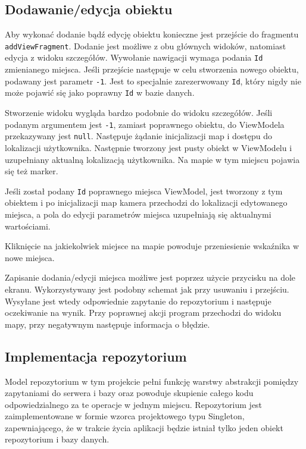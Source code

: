 \documentclass[polish,polish,a4paper,12pt]{article}
\begin{document}
	\subsection{Dodawanie/edycja obiektu}

	Aby wykonać dodanie bądź edycję obiektu konieczne jest przejście do fragmentu \texttt{addViewFragment}. Dodanie jest możliwe z obu głównych widoków, natomiast edycja z widoku szczegółów. Wywołanie nawigacji wymaga podania \texttt{Id} zmienianego miejsca. Jeśli przejście następuje w celu stworzenia nowego obiektu, podawany jest parametr \texttt{-1}. Jest to specjalnie zarezerwowany \texttt{Id}, który nigdy nie może pojawić się jako poprawny \texttt{Id} w bazie danych.

	Stworzenie widoku wygląda bardzo podobnie do widoku szczegółów. Jeśli podanym argumentem jest \texttt{-1}, zamiast poprawnego obiektu, do ViewModela przekazywany jest \texttt{null}. Następuje żądanie inicjalizacji map i dostępu do lokalizacji użytkownika. Następnie tworzony jest pusty obiekt w ViewModelu i uzupełniany aktualną lokalizacją użytkownika. Na mapie w tym miejscu pojawia się też marker.

	Jeśli został podany \texttt{Id} poprawnego miejsca ViewModel, jest tworzony z tym obiektem i po inicjalizacji map kamera przechodzi do lokalizacji edytowanego miejsca, a pola do edycji parametrów miejsca uzupełniają się aktualnymi wartościami.

	Kliknięcie na jakiekolwiek miejsce na mapie powoduje przeniesienie wskaźnika w nowe miejsca.

	Zapisanie dodania/edycji miejsca możliwe jest poprzez użycie przycisku na dole ekranu. Wykorzystywany jest podobny schemat jak przy usuwaniu i przejściu. Wysyłane jest wtedy odpowiednie zapytanie do repozytorium i następuje oczekiwanie na wynik. Przy poprawnej akcji program przechodzi do widoku mapy, przy negatywnym następuje informacja o błędzie.

	\subsection{Implementacja repozytorium}

	Model repozytorium w tym projekcie pełni funkcję warstwy abstrakcji pomiędzy zapytaniami do serwera i bazy oraz powoduje skupienie całego kodu odpowiedzialnego za te operacje w jednym miejscu. Repozytorium jest zaimplementowane w formie wzorca projektowego typu Singleton, zapewniającego, że w trakcie życia aplikacji będzie istniał tylko jeden obiekt repozytorium i bazy danych.
\end{document}

